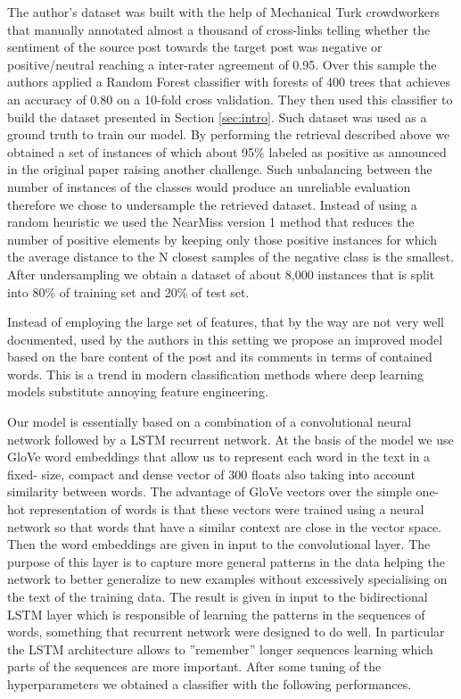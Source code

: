 \documentclass{article}
\begin{document}
The author's dataset was built with the help of Mechanical Turk crowdworkers
that manually annotated almost a thousand of cross-links telling whether the
sentiment of the source post towards the target post was negative or
positive/neutral reaching a inter-rater agreement of 0.95. Over this sample the
authors applied a Random Forest classifier with forests of 400 trees that
achieves an accuracy of 0.80 on a 10-fold cross validation. They then used this
classifier to build the dataset presented in Section \ref{sec:intro}. Such
dataset was used as a ground
truth to train our model. By performing the retrieval described above we
obtained a set of instances of which about 95\% labeled as positive as
announced in the original paper raising another challenge. Such unbalancing
between the number of
instances of the classes would produce an unreliable evaluation therefore we
chose to undersample the retrieved dataset. Instead of using a random heuristic
we used the NearMiss version 1 method that reduces the number of positive
elements by keeping only those positive instances for which the average distance
to the N closest samples of the negative class is the smallest. After
undersampling we obtain a dataset of about 8,000 instances that is split into
80\% of training set and 20\% of test set.

Instead of employing the large set of features, that by the way are not
very well documented, used by the authors in this setting we propose an improved
model based on the bare content of the post and its comments in terms of
contained words. This is a trend in modern classification methods
where deep learning models substitute annoying feature engineering.


Our model is essentially based on a combination of a convolutional
neural network followed by a LSTM recurrent network. At the basis of the model we
use GloVe word embeddings that allow us to represent each word in the text in a fixed-
size, compact and dense vector of 300 floats also taking into account similarity between
words. The advantage of GloVe vectors over the simple one-hot representation of words
is that these vectors were trained using a neural network so that words that have a
similar context are close in the vector space. Then the word embeddings are given in 
input to the convolutional layer. The purpose
of this layer is to capture more general patterns in the data helping the network to better
generalize to new examples without excessively specialising on the text of the training
data. The result is given in input to the bidirectional LSTM layer which is responsible
of learning the patterns in the sequences of words, something that recurrent network
were designed to do well. In particular the LSTM architecture allows to ”remember”
longer sequences learning which parts of the sequences are more important. After
some tuning of the hyperparameters we obtained a classifier with the following
performances.
\end{document}
